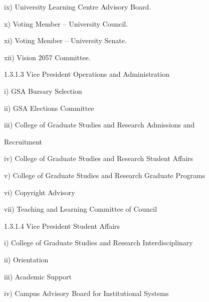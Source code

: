   

  

  

  

          ix)       University Learning Centre Advisory Board.   

  

          x)        Voting Member – University Council.   

  

          xi)       Voting Member – University Senate.   

          xii)      Vision 2057 Committee.   

  

1.3.1.3             Vice President Operations and Administration   

  

          i)        GSA Bursary Selection   

  

          ii)       GSA Elections Committee   

  

          iii)      College  of  Graduate  Studies  and  Research  Admissions  and  

                    Recruitment   

  

          iv)       College of Graduate Studies and Research Student Affairs   

  

          v)        College of Graduate Studies and Research Graduate Programs   

  

          vi)       Copyright Advisory   

  

          vii)      Teaching and Learning Committee of Council   

  

1.3.1.4             Vice President Student Affairs   

  

          i)        College of Graduate Studies and Research Interdisciplinary   

  

          ii)       Orientation   

  

          iii)      Academic Support   

  

          iv)       Campus Advisory Board for Institutional Systems   

